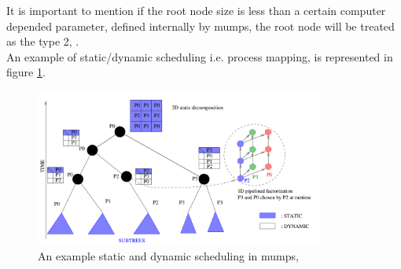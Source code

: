 It is important to mention if the root node size is less than a certain computer depended parameter, defined internally by \gls{mumps}, the root node will be treated as the type 2, \cite{mumps-manual}.\\


An example of static/dynamic scheduling i.e. process mapping, is represented in figure \ref{fig:mumps:mapping-and-scheduling}.\\


\figpointer{\ref{fig:mumps:mapping-and-scheduling}}
\begin{figure}[htpb]
  \centering
  \includegraphics[width=0.85\textwidth]{figures/chapter-2/mumps-task-data-parallelism-2.png}
    \caption{An example static and dynamic scheduling in \gls{mumps}, \cite{l2012multifrontal}}
\label{fig:mumps:mapping-and-scheduling}
\end{figure}


